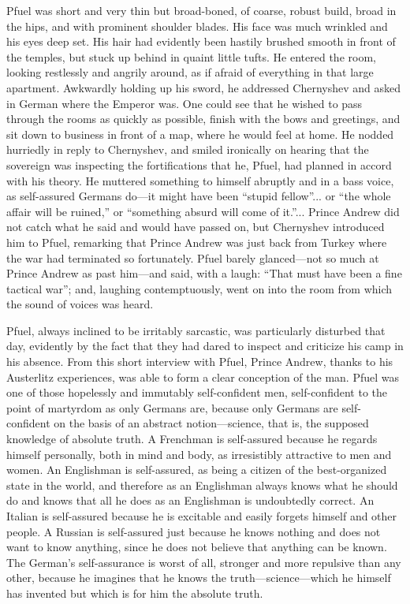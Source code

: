 Pfuel was short and very thin but broad-boned, of coarse, robust
build, broad in the hips, and with prominent shoulder blades. His
face was much wrinkled and his eyes deep set. His hair had
evidently been hastily brushed smooth in front of the temples,
but stuck up behind in quaint little tufts. He entered the room,
looking restlessly and angrily around, as if afraid of everything
in that large apartment. Awkwardly holding up his sword, he
addressed Chernyshev and asked in German where the Emperor
was. One could see that he wished to pass through the rooms as
quickly as possible, finish with the bows and greetings, and sit
down to business in front of a map, where he would feel at
home. He nodded hurriedly in reply to Chernyshev, and smiled
ironically on hearing that the sovereign was inspecting the
fortifications that he, Pfuel, had planned in accord with his
theory. He muttered something to himself abruptly and in a bass
voice, as self-assured Germans do---it might have been ``stupid
fellow''... or ``the whole affair will be ruined,'' or
``something absurd will come of it.''... Prince Andrew did not
catch what he said and would have passed on, but Chernyshev
introduced him to Pfuel, remarking that Prince Andrew was just
back from Turkey where the war had terminated so
fortunately. Pfuel barely glanced---not so much at Prince Andrew
as past him---and said, with a laugh: ``That must have been a
fine tactical war''; and, laughing contemptuously, went on into
the room from which the sound of voices was heard.

Pfuel, always inclined to be irritably sarcastic, was
particularly disturbed that day, evidently by the fact that they
had dared to inspect and criticize his camp in his absence. From
this short interview with Pfuel, Prince Andrew, thanks to his
Austerlitz experiences, was able to form a clear conception of
the man. Pfuel was one of those hopelessly and immutably
self-confident men, self-confident to the point of martyrdom as
only Germans are, because only Germans are self-confident on the
basis of an abstract notion---science, that is, the supposed
knowledge of absolute truth. A Frenchman is self-assured because
he regards himself personally, both in mind and body, as
irresistibly attractive to men and women. An Englishman is
self-assured, as being a citizen of the best-organized state in
the world, and therefore as an Englishman always knows what he
should do and knows that all he does as an Englishman is
undoubtedly correct. An Italian is self-assured because he is
excitable and easily forgets himself and other people. A Russian
is self-assured just because he knows nothing and does not want
to know anything, since he does not believe that anything can be
known. The German's self-assurance is worst of all, stronger and
more repulsive than any other, because he imagines that he knows
the truth---science---which he himself has invented but which is
for him the absolute truth.

